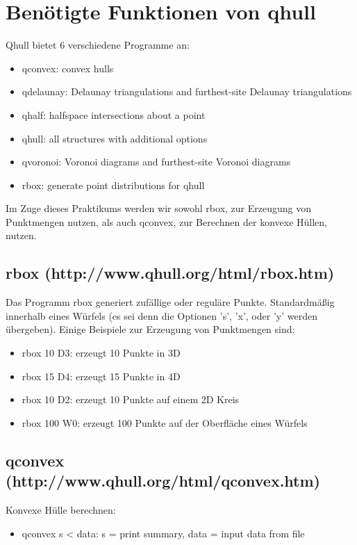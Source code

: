 \documentclass[12pt]{scrartcl}
\begin{document}
\section{Benötigte Funktionen von qhull}

Qhull bietet 6 verschiedene Programme an:
\begin{itemize}
    \setlength\itemsep{0em}
    \item qconvex: convex hulls
    \item qdelaunay: Delaunay triangulations and furthest-site Delaunay triangulations
    \item qhalf: halfspace intersections about a point
    \item qhull: all structures with additional options
    \item qvoronoi: Voronoi diagrams and furthest-site Voronoi diagrams
    \item rbox: generate point distributions for qhull
\end{itemize}

Im Zuge dieses Praktikums werden wir sowohl rbox, zur Erzeugung von Punktmengen nutzen, als auch qconvex, zur Berechnen der konvexe Hüllen, nutzen.

\subsection{rbox (http://www.qhull.org/html/rbox.htm)}
Das Programm rbox generiert zufällige oder reguläre Punkte. Standardmäßig innerhalb eines Würfels (es sei denn die Optionen 's', 'x', oder 'y' werden übergeben).
Einige Beispiele zur Erzeugung von Punktmengen sind:
\begin{itemize}
    \setlength\itemsep{0em}
    \item rbox 10 D3: erzeugt 10 Punkte in 3D
    \item rbox 15 D4: erzeugt 15 Punkte in 4D
    \item rbox 10 D2: erzeugt 10 Punkte auf einem 2D Kreis
    \item rbox 100 W0: erzeugt 100 Punkte  auf der Oberfläche eines Würfels
\end{itemize}


\subsection{qconvex (http://www.qhull.org/html/qconvex.htm)}



Konvexe Hülle berechnen:
\begin{itemize}
    \item qconvex s < data: s = print summary, data = input data from file
\end{itemize}
\ \\
\end{document}

